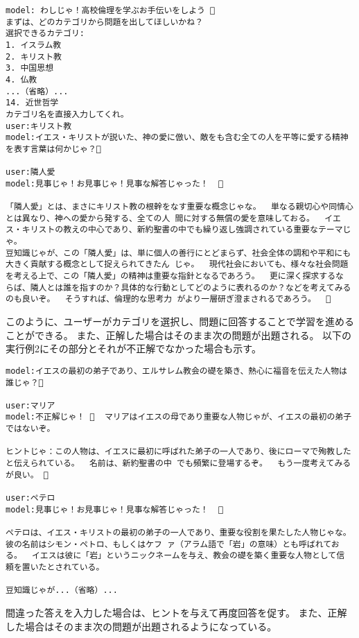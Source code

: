 \documentclass[a4paper,11pt]{ltjsarticle}
\begin{document}
\begin{tcolorbox}[title=実行例1]
\begin{verbatim}
model: わしじゃ！高校倫理を学ぶお手伝いをしよう 🦉
まずは、どのカテゴリから問題を出してほしいかね？
選択できるカテゴリ:
1. イスラム教
2. キリスト教
3. 中国思想
4. 仏教
...（省略）...
14. 近世哲学
カテゴリ名を直接入力してくれ。
user:キリスト教
model:イエス・キリストが説いた、神の愛に倣い、敵をも含む全ての人を平等に愛する精神を表す言葉は何かじゃ？🦉

user:隣人愛
model:見事じゃ！お見事じゃ！見事な解答じゃった！  🦉

「隣人愛」とは、まさにキリスト教の根幹をなす重要な概念じゃな。  単なる親切心や同情心とは異なり、神への愛から発する、全ての人 間に対する無償の愛を意味しておる。  イエス・キリストの教えの中心であり、新約聖書の中でも繰り返し強調されている重要なテーマじゃ。
豆知識じゃが、この「隣人愛」は、単に個人の善行にとどまらず、社会全体の調和や平和にも大きく貢献する概念として捉えられてきたん じゃ。  現代社会においても、様々な社会問題を考える上で、この「隣人愛」の精神は重要な指針となるであろう。  更に深く探求するな らば、隣人とは誰を指すのか？具体的な行動としてどのように表れるのか？などを考えてみるのも良いぞ。  そうすれば、倫理的な思考力 がより一層研ぎ澄まされるであろう。  🦉
\end{verbatim}
\end{tcolorbox}
このように、ユーザーがカテゴリを選択し、問題に回答することで学習を進めることができる。
また、正解した場合はそのまま次の問題が出題される。
以下の実行例2にその部分とそれが不正解でなかった場合も示す。
\begin{tcolorbox}[title=実行例2]
\begin{verbatim}
model:イエスの最初の弟子であり、エルサレム教会の礎を築き、熱心に福音を伝えた人物は誰じゃ？🦉

user:マリア
model:不正解じゃ！ 🦉  マリアはイエスの母であり重要な人物じゃが、イエスの最初の弟子ではないぞ。

ヒントじゃ：この人物は、イエスに最初に呼ばれた弟子の一人であり、後にローマで殉教したと伝えられている。  名前は、新約聖書の中 でも頻繁に登場するぞ。  もう一度考えてみるが良い。 🦉

user:ペテロ
model:見事じゃ！お見事じゃ！見事な解答じゃった！  🦉

ペテロは、イエス・キリストの最初の弟子の一人であり、重要な役割を果たした人物じゃな。  彼の名前はシモン・ペトロ、もしくはケフ ァ（アラム語で「岩」の意味）とも呼ばれておる。  イエスは彼に「岩」というニックネームを与え、教会の礎を築く重要な人物として信 頼を置いたとされている。

豆知識じゃが...（省略）...
\end{verbatim}
\end{tcolorbox}
間違った答えを入力した場合は、ヒントを与えて再度回答を促す。
また、正解した場合はそのまま次の問題が出題されるようになっている。
\end{document}
